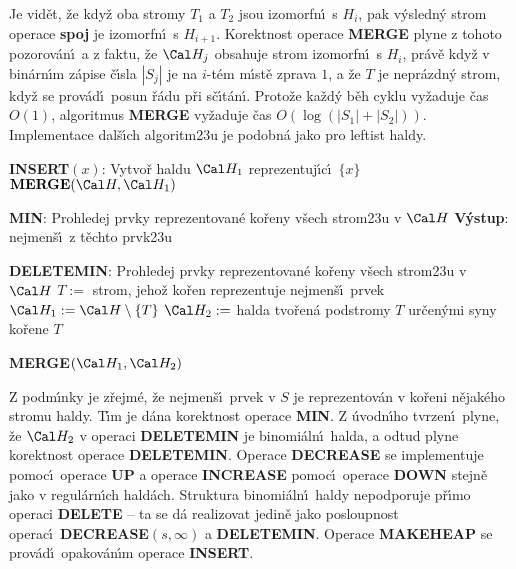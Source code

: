 \flushpar Je vid\v et, \v ze kdy\v z oba stromy $T_1$ a $T_2$ jsou izomorfn\'\i\ 
s $H_i$, pak v\'ysledn\'y strom operace {\bf spoj} je izomorfn\'\i\ 
s $H_{i+1}$. Korektnost ope\-race {\bf MERGE} plyne z tohoto 
pozorov\'an\'\i\ a z faktu, \v ze $\Cal H_j$ obsahuje strom izomorfn\'\i\ s 
$H_i$, pr\'av\v e kdy\v z v bin\'arn\'\i m z\'apise \v c\'\i sla $
|S_j|$ je na $i$-t\'em 
m\'\i st\v e zprava $1$, a \v ze $T$ je nepr\'azdn\'y strom, kdy\v z se 
prov\'ad\'\i\ posun \v r\'adu p\v ri s\v c\'\i t\'an\'\i . Proto\v ze ka\v zd\'y b\v eh 
cyklu vy\v zaduje \v cas $O(1)$, algoritmus {\bf MER\-GE} vy\v zaduje \v cas 
$O(\log(|S_1|+|S_2|))$. Implementace dal\v s\'\i ch algoritm\accent23u 
je podobn\'a jako pro leftist haldy. 
\bigskip

{\bf INSERT$(x)$}:\newline 
Vytvo\v r haldu $\Cal H_1$ reprezentuj\'\i c\'\i\ $\{x\}$\newline 
$\bold M\bold E\bold R\bold G\bold E(\Cal H,\Cal H_1)$
\bigskip

{\bf MIN}:\newline 
Prohledej prvky reprezentovan\'e ko\v reny v\v sech strom\accent23u 
v $\Cal H$\newline 
{\bf V\'ystup}: nejmen\v s\'\i\ z t\v echto prvk\accent23u  
\bigskip

{\bf DELETEMIN}:\newline 
Prohledej prvky reprezentovan\'e ko\v reny v\v sech strom\accent23u 
v $\Cal H$\newline 
$T:=$ strom, jeho\v z ko\v ren reprezentuje nejmen\v s\'\i\ prvek\newline 
$\Cal H_1:=\Cal H\setminus \{T\}$\newline 
$\Cal H_2:=$ halda tvo\v ren\'a podstromy $T$ ur\v cen\'ymi syny ko\v rene $
T$\newline 
{\bf MERGE$(\Cal H_1,\Cal H_2)$
\bigskip

}\flushpar Z podm\'\i nky  je z\v rejm\'e, \v ze 
nejmen\v s\'\i\ prvek v $S$ je reprezentov\'an v ko\v reni n\v ejak\'eho  
stromu haldy. T\'\i m je d\'ana korekt\-nost operace {\bf MIN}.
Z \'uvodn\'\i ho tvrzen\'\i\ plyne, \v ze $\Cal H_2$ v operaci {\bf DELE\-TE\-MIN} je 
binomi\'aln\'\i\ halda, a odtud plyne korekt\-nost ope\-race 
{\bf DE\-LE\-TEMIN}. Operace {\bf DECREASE} se implementuje pomoc\'\i\ 
ope\-race {\bf UP} a ope\-race {\bf INCREASE} pomoc\'\i\ 
operace {\bf DOWN} stejn\v e jako v regul\'arn\'\i ch hald\'ach. 
Struktura binomi\'aln\'\i\ haldy nepodporuje p\v r\'\i mo operaci 
{\bf DELETE} -- ta se d\'a realizovat jedin\v e jako posloupnost 
operac\'\i\ {\bf DECREASE$(s,\infty )$} a {\bf DELETEMIN}.  
Operace {\bf MAKEHEAP} se prov\'ad\'\i\ opakov\'an\'\i m operace {\bf INSERT}.
\medskip

